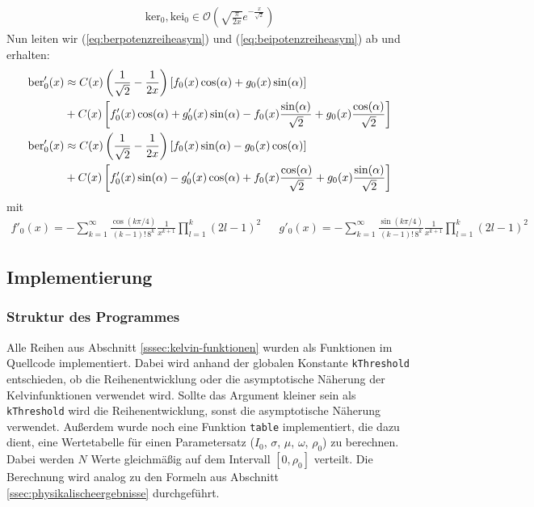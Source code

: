 \documentclass[10pt,a4paper]{article}
\begin{document}
\begin{align}
	\mathrm{ker}_0, \mathrm{kei}_0 \in \mathcal{O}\left( \sqrt{\frac{\pi}{2 x}}e^{-\frac{x}{\sqrt{2}}} \right)
\end{align}
Nun leiten wir (\ref{eq:berpotenzreiheasym}) und (\ref{eq:beipotenzreiheasym}) ab und erhalten:
\begin{align}
	\mathrm{ber}'_0(x) &\approx C(x) \left( \frac{1}{\sqrt{2}} - \frac{1}{2x} \right) \left[f_0(x) \cos(\alpha) + g_0(x) \sin(\alpha) \right] \notag\\ & + C(x) \left[ f'_0(x) \cos(\alpha) + g'_0(x) \sin(\alpha) - f_0(x) \frac{\sin(\alpha)}{\sqrt{2}} + g_0(x) \frac{\cos(\alpha)}{\sqrt{2}} \right]\label{eq:dberpotenzreiheasym}\\
	\mathrm{ber}'_0(x) &\approx C(x) \left( \frac{1}{\sqrt{2}} - \frac{1}{2x} \right) \left[f_0(x) \sin(\alpha) - g_0(x) \cos(\alpha) \right] \notag\\ & + C(x) \left[ f'_0(x) \sin(\alpha) - g'_0(x) \cos(\alpha) + f_0(x) \frac{\cos(\alpha)}{\sqrt{2}} + g_0(x) \frac{\sin(\alpha)}{\sqrt{2}} \right] \label{eq:dbeipotenzreiheasym}
\end{align}
mit
\begin{align}
	f'_0(x) = - \sum^{\infty}_{k=1} \frac{\cos(k \pi / 4)}{(k-1)! \, 8^k} \frac{1}{x^{k+1}} \prod^{k}_{l=1}(2l - 1)^2&&
	g'_0(x) = -\sum^{\infty}_{k=1} \frac{\sin(k \pi / 4)}{(k-1)! \, 8^k} \frac{1}{x^{k+1}} \prod^{k}_{l=1}(2l - 1)^2\label{eq:d_f0g0}
\end{align}

\subsection{Implementierung}

\subsubsection{Struktur des Programmes}
Alle Reihen aus Abschnitt \ref{sssec:kelvin-funktionen} wurden als Funktionen im Quellcode implementiert.
Dabei wird anhand der globalen Konstante \texttt{kThreshold} entschieden, ob die Reihenentwicklung oder die asymptotische Näherung der Kelvinfunktionen verwendet wird.
Sollte das Argument kleiner sein als \texttt{kThreshold} wird die Reihenentwicklung, sonst die asymptotische Näherung verwendet.
Außerdem wurde noch eine Funktion \texttt{table} implementiert, die dazu dient, eine Wertetabelle für einen Parametersatz ($I_0$, $\sigma$, $\mu$, $\omega$, $\rho_0$) zu berechnen.
Dabei werden $N$ Werte gleichmäßig auf dem Intervall $[0,\rho_0]$ verteilt. Die Berechnung wird analog zu den Formeln aus Abschnitt \ref{ssec:physikalischeergebnisse} durchgeführt.
\end{document}

